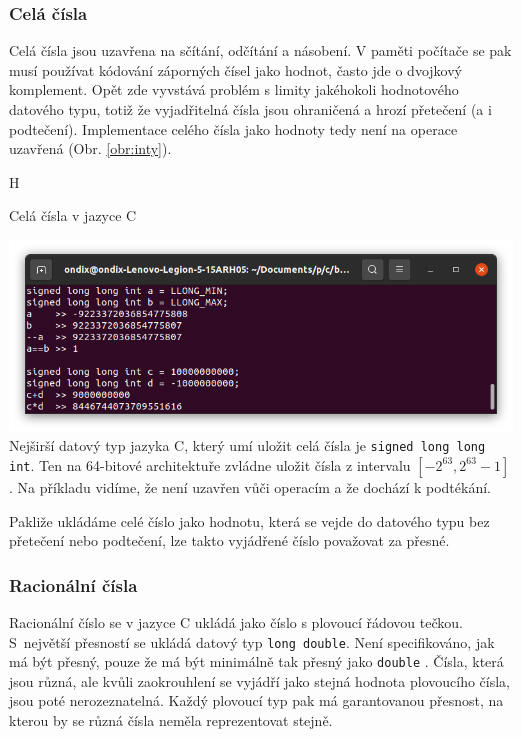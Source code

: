 \subsubsection{Celá čísla}
Celá čísla jsou uzavřena na sčítání, odčítání a násobení. V paměti počítače se pak musí používat kódování záporných čísel jako hodnot, často jde o dvojkový komplement. Opět zde vyvstává problém s limity jakéhokoli hodnotového datového typu, totiž že vyjadřitelná čísla jsou ohraničená a hrozí přetečení (a i podtečení). Implementace celého čísla jako hodnoty tedy není na operace uzavřená (Obr. \ref{obr:inty}).
\begin{myfigure}{H}
\caption{Celá čísla v jazyce C}
\includegraphics[width=\linewidth]{./graphics/inty.png}\label{obr:inty}
Nejširší datový typ jazyka C, který umí uložit celá čísla je \texttt{signed long long int}. Ten na 64-bitové architektuře zvládne uložit čísla z intervalu $[-2^{63}, 2^{63}-1]$. Na příkladu vidíme, že není uzavřen vůči operacím a že dochází k podtékání.
\end{myfigure}
Pakliže ukládáme celé číslo jako hodnotu, která se vejde do datového typu bez přetečení nebo podtečení, lze takto vyjádřené číslo považovat za přesné.

\subsubsection{Racionální čísla}
Racionální číslo se v jazyce C ukládá jako číslo s plovoucí řádovou tečkou. S~největší přesností se ukládá datový typ \texttt{long double}. Není specifikováno, jak má být přesný, pouze že má být minimálně tak přesný jako \texttt{double} \cite{wiki:LD}. Čísla, která jsou různá, ale kvůli zaokrouhlení se vyjádří jako stejná hodnota plovoucího čísla, jsou poté nerozeznatelná. Každý plovoucí typ pak má garantovanou přesnost, na kterou by se různá čísla neměla reprezentovat stejně.

